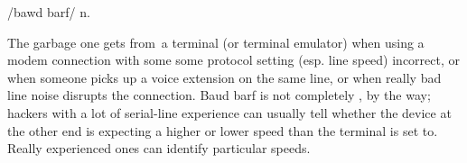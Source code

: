  /bawd barf/ n.

The garbage one gets \textlangle from\textrangle\ a terminal (or terminal
emulator) when using a modem connection with some some protocol setting (esp.
line speed) incorrect, or when someone picks up a voice extension on the same
line, or when really bad line noise disrupts the connection. Baud barf is not
completely , by the way; hackers with a lot of serial-line
experience can usually tell whether the device at the other end is expecting a
higher or lower speed than the terminal is set to. Really experienced ones can
identify particular speeds.

